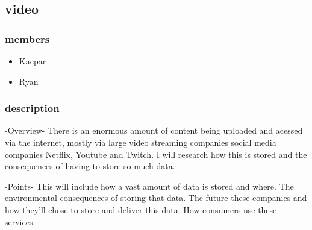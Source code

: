 \documentclass{article}
\begin{document}
\subsection{video}
\subsubsection{members}
\begin{itemize}
    \item Kacpar
    \item Ryan
\end{itemize}
\subsubsection{description}
    -Overview-
    There is an enormous amount of content being uploaded and acessed via the internet, mostly via large video 
    streaming companies social media companies Netflix, Youtube and Twitch. I will research
    how this is stored and the consequences of having to store so much data.

    -Points-
    This will include how a vast amount of data is stored and where. 
    The environmental consequences of storing that data.
    The future these companies and how they'll chose to store and deliver this data.
    How consumers use these services.
\end{document}
